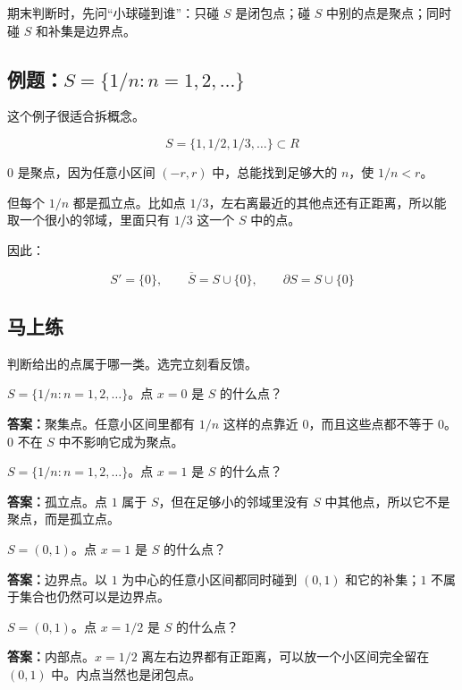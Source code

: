 期末判断时，先问“小球碰到谁”：只碰 \(S\) 是闭包点；碰 \(S\) 中别的点是聚点；同时碰 \(S\) 和补集是边界点。

\subsection*{例题：\(S=\{1/n:n=1,2,\ldots\}\)}

这个例子很适合拆概念。

\[
      S=\{1,1/2,1/3,\ldots\}\subset R
    \]

\(0\) 是聚点，因为任意小区间 \((-r,r)\) 中，总能找到足够大的 \(n\)，使 \(1/n<r\)。

但每个 \(1/n\) 都是孤立点。比如点 \(1/3\)，左右离最近的其他点还有正距离，所以能取一个很小的邻域，里面只有 \(1/3\) 这一个 \(S\) 中的点。

因此：

\[
      S'=\{0\},\qquad \overline S=S\cup\{0\},\qquad \partial S=S\cup\{0\}
    \]

\subsection*{马上练}

判断给出的点属于哪一类。选完立刻看反馈。

\begin{quickcheck}
\(S=\{1/n:n=1,2,\ldots\}\)。点 \(x=0\) 是 \(S\) 的什么点？

\tcblower
\textbf{答案：}聚集点。任意小区间里都有 \(1/n\) 这样的点靠近 \(0\)，而且这些点都不等于 \(0\)。\(0\) 不在 \(S\) 中不影响它成为聚点。
\end{quickcheck}

\begin{quickcheck}
\(S=\{1/n:n=1,2,\ldots\}\)。点 \(x=1\) 是 \(S\) 的什么点？

\tcblower
\textbf{答案：}孤立点。点 \(1\) 属于 \(S\)，但在足够小的邻域里没有 \(S\) 中其他点，所以它不是聚点，而是孤立点。
\end{quickcheck}

\begin{quickcheck}
\(S=(0,1)\)。点 \(x=1\) 是 \(S\) 的什么点？

\tcblower
\textbf{答案：}边界点。以 \(1\) 为中心的任意小区间都同时碰到 \((0,1)\) 和它的补集；\(1\) 不属于集合也仍然可以是边界点。
\end{quickcheck}

\begin{quickcheck}
\(S=(0,1)\)。点 \(x=1/2\) 是 \(S\) 的什么点？

\tcblower
\textbf{答案：}内部点。\(x=1/2\) 离左右边界都有正距离，可以放一个小区间完全留在 \((0,1)\) 中。内点当然也是闭包点。
\end{quickcheck}

